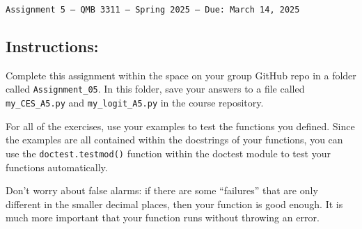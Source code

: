 \documentclass[11pt]{exam}
\begin{document}
\texttt{Assignment 5 --- QMB 3311 ---  Spring 2025  --- Due: March 14, 2025}

\subsection*{Instructions:}

Complete this assignment within the space on your group GitHub repo in a folder called \texttt{Assignment\_05}. In this folder, save your answers to a file called \texttt{my\_CES\_A5.py} and \texttt{my\_logit\_A5.py} in the course repository.

For all of the exercises, use your examples to test the functions you defined. Since the examples are all contained within the docstrings of your functions, you can use the
\texttt{doctest.testmod()} function within the doctest module to test your functions automatically.

Don't worry about false alarms: if there are some ``failures'' that are only different in the smaller decimal places, then your function is good enough. It is much more important that your function runs without throwing an error.
\end{document}
